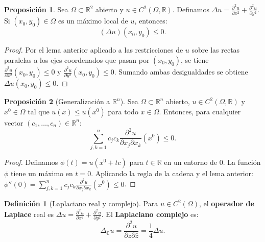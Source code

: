 \documentclass[11pt,a4paper]{article}
\theoremstyle{definition}
\newtheorem{definicion}{Definición}[section]
\newtheorem{proposicion}{Proposición}[section]
\theoremstyle{remark}
\numberwithin{equation}{section}
\begin{document}
\begin{proposicion}
Sea $\Omega \subset \mathbb{R}^2$ abierto y $u \in C^2(\Omega, \mathbb{R})$. Definamos $\Delta u = \frac{\partial^2 u}{\partial x^2} + \frac{\partial^2 u}{\partial y^2}$. Si $(x_0, y_0) \in \Omega$ es un máximo local de $u$, entonces:
\begin{equation}
(\Delta u)(x_0, y_0) \le 0.
\end{equation}
\end{proposicion}
\begin{proof}
Por el lema anterior aplicado a las restricciones de $u$ sobre las rectas paralelas a los ejes coordenados que pasan por $(x_0,y_0)$, se tiene $\frac{\partial^2 u}{\partial x^2}(x_0,y_0) \le 0$ y $\frac{\partial^2 u}{\partial y^2}(x_0,y_0) \le 0$. Sumando ambas desigualdades se obtiene $\Delta u(x_0,y_0) \le 0$.
\end{proof}

\begin{proposicion}[Generalización a $\mathbb{R}^n$]
Sea $\Omega \subset \mathbb{R}^n$ abierto, $u \in C^2(\Omega, \mathbb{R})$ y $x^0 \in \Omega$ tal que $u(x) \le u(x^0)$ para todo $x \in \Omega$. Entonces, para cualquier vector $(c_1, \dots, c_n) \in \mathbb{R}^n$:
\begin{equation}
\sum_{j,k=1}^n c_j c_k \frac{\partial^2 u}{\partial x_j \partial x_k}(x^0) \le 0.
\end{equation}
\end{proposicion}
\begin{proof}
Definamos $\phi(t) = u(x^0 + t c)$ para $t \in \mathbb{R}$ en un entorno de $0$. La función $\phi$ tiene un máximo en $t = 0$. Aplicando la regla de la cadena y el lema anterior: $\phi''(0) = \sum_{j,k=1}^n c_j c_k \frac{\partial^2 u}{\partial x_j \partial x_k}(x^0) \le 0$.
\end{proof}

\begin{definicion}[Laplaciano real y complejo]
Para $u \in C^2(\Omega)$, el \textbf{operador de Laplace} real es $\Delta u = \frac{\partial^2 u}{\partial x^2} + \frac{\partial^2 u}{\partial y^2}$. El \textbf{Laplaciano complejo} es:
\begin{equation}
\Delta_\mathbb{C} u = \frac{\partial^2 u}{\partial z \partial \bar{z}} = \frac{1}{4} \Delta u.
\end{equation}
\end{definicion}
\end{document}
